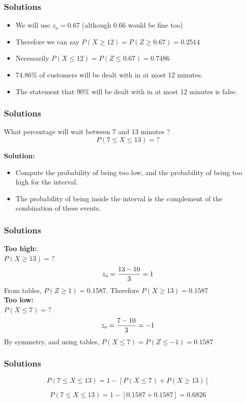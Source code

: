 \documentclass[a4]{beamer}
\begin{document}
\begin{frame}
\frametitle{Solutions}
\begin{itemize}
\item We will use $z_o =0.67$ (although 0.66 would be fine too) 
\item Therefore we can say $P(X \geq 12 ) = P(Z \geq 0.67)  = 0.2514$
\item Necessarily  $P(X \leq 12 ) = P(Z \leq 0.67) = 0.7486$
\item $74.86\%$ of customers will be dealt with in at most 12 minutes.
\item The statement that $90\%$ will be dealt with in at most 12 minutes is false.
\end{itemize}
\end{frame}
\begin{frame}
\frametitle{Solutions}
What percentage will wait between 7 and 13 minutes ?\\

\[P(7 \leq X \leq 13)   = ?\]

\textbf{Solution:}
\begin{itemize}
	\item Compute the probability of being too low, and the probability of being too high for the interval.\item The probability of being inside the interval is the complement of the combination of these events.
\end{itemize}

\end{frame}
\begin{frame}
\frametitle{Solutions}
\textbf{Too high:}\\
$P(X \geq 13) = ?$
\[ z_o  = {13 - 10  \over 3} = 1\]
\smallskip
From tables, $P(Z \geq 1) = 0.1587$. Therefore $P(X \geq 13) = 0.1587$\\ \bigskip
\textbf{Too low:}\\
$P(X \leq 7) = ?$
\[ z_o  = {7 - 10  \over 3} = -1\]
By symmetry, and using tables, $P(X \leq 7) = P(Z \leq -1)= 0.1587$\\ \bigskip
\end{frame}
\begin{frame}
\frametitle{Solutions}

\[P(7 \leq X \leq 13)  = 1 - [ P(X \leq 7)  + P(X \geq 13) ] \]

\[P(7 \leq X \leq 13)  =  1 - [0.1587+0.1587] = 0.6826\]

\end{frame}
\end{document}
